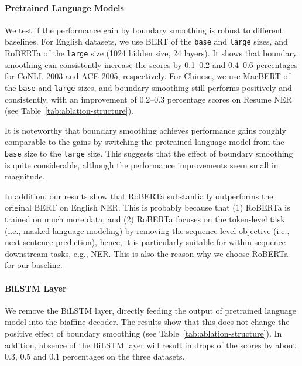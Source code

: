 \documentclass[11pt]{article}
\begin{document}
\paragraph{Pretrained Language Models} We test if the performance gain by boundary smoothing is robust to different baselines. For English datasets, we use BERT \citep{devlin-etal-2019-bert} of the \texttt{base} and \texttt{large} sizes, and RoBERTa \citep{liu2019roberta} of the \texttt{large} size (1024 hidden size, 24 layers). It shows that boundary smoothing can consistently increase the  scores by 0.1--0.2 and 0.4--0.6 percentages for CoNLL 2003 and ACE 2005, respectively. For Chinese, we use MacBERT \citep{cui-etal-2020-revisiting} of the \texttt{base} and \texttt{large} sizes, and boundary smoothing still performs positively and consistently, with an improvement of 0.2--0.3 percentage  scores on Resume NER (see Table~\ref{tab:ablation-structure}). 

It is noteworthy that boundary smoothing achieves performance gains roughly comparable to the gains by switching the pretrained language model from the \texttt{base} size to the \texttt{large} size. This suggests that the effect of boundary smoothing is quite considerable, although the performance improvements seem small in magnitude. 

In addition, our results show that RoBERTa substantially outperforms the original BERT on English NER. This is probably because that (1) RoBERTa is trained on much more data; and (2) RoBERTa focuses on the token-level task (i.e., masked language modeling) by removing the sequence-level objective (i.e., next sentence prediction), hence, it is particularly suitable for within-sequence downstream tasks, e.g., NER. This is also the reason why we choose RoBERTa for our baseline. 


\paragraph{BiLSTM Layer} We remove the BiLSTM layer, directly feeding the output of pretrained language model into the biaffine decoder. The results show that this does not change the positive effect of boundary smoothing (see Table~\ref{tab:ablation-structure}). In addition, absence of the BiLSTM layer will result in drops of the  scores by about 0.3, 0.5 and 0.1 percentages on the three datasets. 
\end{document}
